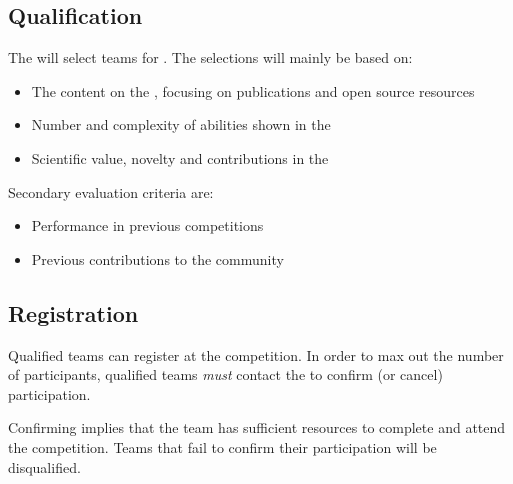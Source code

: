 
\subsection{Qualification}
\label{sec:rules:qualification}
The \OC{} will select teams for \Qualification{}. The selections will mainly be based on:
\begin{itemize}
	\item The content on the \TeamWebsite{}, focusing on publications and open source resources
	\item Number and complexity of abilities shown in the \TeamVideo{}
	\item Scientific value, novelty and contributions in the \TDP{}

\end{itemize}
Secondary evaluation criteria are:
\begin{itemize}
	\item Performance in previous competitions
	\item Previous contributions to the \AtHome{} community
\end{itemize}

\subsection{Registration}
\label{sec:rules:registration}
Qualified teams can register at the \RoboCup\AtHome{} competition. In order to max out the number of participants, qualified teams \emph{must} contact the \OC{} to confirm (or cancel) participation.

Confirming implies that the team has sufficient resources to complete \Registration{} and attend the competition. Teams that fail to confirm their participation will be disqualified.

